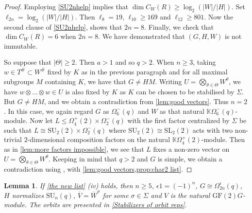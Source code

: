 \documentclass[12pt]{amsart}
\newtheorem{lemma}[theorem]{Lemma}
\theoremstyle{remark}
\theoremstyle{notation}
\theoremstyle{definition}
\newcommand{\SU}{\mathrm{SU}}
\newcommand{\GF}{\mathrm{GF}}
\newcommand{\SL}{\mathrm{SL}}
\newcommand{\0}{\emptyset}
\begin{document}
\begin{proof}
Employing \cref{SU2nhelp} implies that $\dim C_W(R) \ge \log_2(|W|/|H|)$. Set $\ell_{2n}= \log_2(|W|/|H|)$. Then $\ell_{8}=19$, $\ell_{10}\ge 169$ and $\ell_{12}\ge 801$.
 Now the second clause of \cref{SU2nhelp}, shows that $2n=8$.  Finally, we check that $\dim C_W(R)=6$ when $2n=8$.  We have demonstrated that $(G,H,W)$ is not immutable.

So suppose that $|\Theta|\ge 2$.  Then $a> 1$ and so $q>2$.
When $n \ge 3$, taking $w\in T^\# \subset W^\#$ fixed by $K$ as in the previous paragraph and for all   maximal subgroups $M$ containing $K$, we have that $G\ne HM$.
Writing  $U= \bigotimes_{\theta \in \Theta} W^{\theta}$, we have  $w\otimes \dots \otimes w\in U$ is also fixed by $K$
as $K$ can be chosen to be stabilised by $\Sigma$. But $G\ne HM$, and we obtain a contradiction from \cref{lem:good vectors}. Thus $n=2$. In this case,  we again regard $G$ as $\Omega_6^-(q)$ and $W$ as that natural $\mathbb K\Omega_6^-(q)$-module. Now let $L \le \Omega_4^+(2)\times \Omega_2^-(q)$  with the first factor centralized by $\Sigma$ be such that $L \cong \SU_2(2)\times \Omega_2^-(q)$ where $\SU_2(2)\cong \SL_2(2)$ acts with two non-trivial $2$-dimensional composition factors on the natural $\mathbb K \Omega_4^+(2)$-module. Then as in \cref{lem:more factors impossible}, we see that $L$ fixes a non-zero vector on  $U=\bigotimes_{\theta \in \Theta} W^{\theta}$. Keeping in mind that $q>2$ and $G$ is simple, we obtain a contradiction using \cite[Theorem A, Tables 1, 2 \& 3]{LiebeckPraegerSaxl},   with \cref{lem:good vectors,prop:char2 list}.
\end{proof}


\begin{lemma}\label{Orthogonals and natural} If \cref{the new list} (iv) holds, then  $n \ge 5$, $\epsilon 1= (-1)^n$, $G\cong \Omega_{2n}^\epsilon(q)$, $H$ normalizes  $ \SU_n(q)$, $ \overline V=\overline W^{\sigma}$ for some $\sigma\in \Sigma$ and $V$ is the natural $\GF(2)G$-module. The orbits are presented in \cref{Stabilizers of orbit reps}.
\end{lemma}
\end{document}
